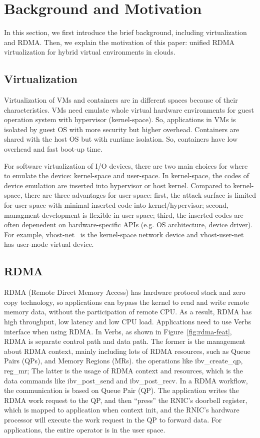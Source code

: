 \section{Background and Motivation}
In this section, we first introduce the brief background, including virtualization and RDMA. Then, we explain the motivation of this paper: unified RDMA virtualization for hybrid virtual environments in clouds.

\subsection{Virtualization}
Virtualization of VMs and containers are in different spaces because of their characteristics. VMs need emulate whole virtual hardware environments for guest operation system with hypervisor (kernel-space). So, applications in VMs is isolated by guest OS with more security but higher overhead. Containers are shared with the host OS but with runtime isolation. So, containers have low overhead and fast boot-up time.

For software virtualization of I/O devices, there are two main choices for where to emulate the device: kernel-space and user-space. In kernel-space, the codes of device emulation are inserted into hypervisor or host kernel. Compared to kernel-space, there are three advantages for user-space: first, the attack surface is limited for user-space with minimal inserted code into kernel/hypervisor; second, managment development is flexible in user-space; third, the inserted codes are often depenedent on hardware-specific APIs (e.g. OS architecture, device driver). For example, vhost-net~\cite{vhost-net} is the kernel-space network device and vhost-user-net~\cite{vhost-user-net} has user-mode virtual device. 

\subsection{RDMA}
RDMA (Remote Direct Memory Access) has hardware protocol stack and zero copy technology, so applications can bypass the kernel to read and write remote memory data, without the participation of remote CPU. As a result, RDMA has high throughput, low latency and low CPU load. Applications need to use Verbs interface when using RDMA. In Verbs, as shown in Figure~\ref{fig:rdma-feat}, RDMA is separate control path and data path. The former is the management about RDMA context, mainly including lots of RDMA resources, such as Queue Pairs (QPs), and Memory Regions (MRs). the operations like ibv\_create\_qp, reg\_mr; The latter is the usage of RDMA context and resources, which is the data commands like ibv\_post\_send and ibv\_post\_recv. In a RDMA workflow, the communication is based on Queue Pair (QP). The application writes the RDMA work request to the QP, and then ``press''  the RNIC's doorbell register, which is mapped to application when context init, and the RNIC's hardware processor will execute the work request in the QP to forward data. For applications, the entire operator is in the user space.

